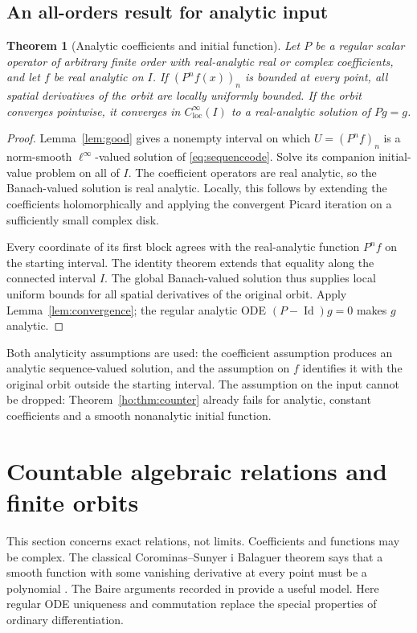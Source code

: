 \documentclass[11pt,reqno]{amsart}
\numberwithin{equation}{section}
\newtheorem{theorem}{Theorem}[section]
\theoremstyle{definition}
\theoremstyle{remark}
\newcommand{\id}{\operatorname{Id}}
\newcommand{\loc}{\mathrm{loc}}
\newcommand{\clim}{C^\infty_{\loc}}
\begin{document}
\subsection{An all-orders result for analytic input}
\begin{theorem}[Analytic coefficients and initial function]\label{thm:analytic}
Let $P$ be a regular scalar operator of arbitrary finite order with real-analytic real or complex coefficients, and let $f$ be real analytic on $I$. If $(P^nf(x))_n$ is bounded at every point, all spatial derivatives of the orbit are locally uniformly bounded. If the orbit converges pointwise, it converges in $\clim(I)$ to a real-analytic solution of $Pg=g$.
\end{theorem}
\begin{proof}
Lemma~\ref{lem:good} gives a nonempty interval on which $U=(P^nf)_n$ is a norm-smooth $\ell^\infty$-valued solution of \eqref{eq:sequenceode}. Solve its companion initial-value problem on all of $I$. The coefficient operators are real analytic, so the Banach-valued solution is real analytic. Locally, this follows by extending the coefficients holomorphically and applying the convergent Picard iteration on a sufficiently small complex disk.

Every coordinate of its first block agrees with the real-analytic function $P^nf$ on the starting interval. The identity theorem extends that equality along the connected interval $I$. The global Banach-valued solution thus supplies local uniform bounds for all spatial derivatives of the original orbit. Apply Lemma~\ref{lem:convergence}; the regular analytic ODE $(P-\id)g=0$ makes $g$ analytic.
\end{proof}
Both analyticity assumptions are used: the coefficient assumption produces an analytic sequence-valued solution, and the assumption on $f$ identifies it with the original orbit outside the starting interval. The assumption on the input cannot be dropped: Theorem~\ref{ho:thm:counter} already fails for analytic, constant coefficients and a smooth nonanalytic initial function.

\section{Countable algebraic relations and finite orbits}\label{sec:algebraic}
This section concerns exact relations, not limits. Coefficients and functions may be complex. The classical Corominas--Sunyer i Balaguer theorem says that a smooth function with some vanishing derivative at every point must be a polynomial \cite{corominas}. The Baire arguments recorded in \cite{gogolev} provide a useful model. Here regular ODE uniqueness and commutation replace the special properties of ordinary differentiation.
\end{document}

